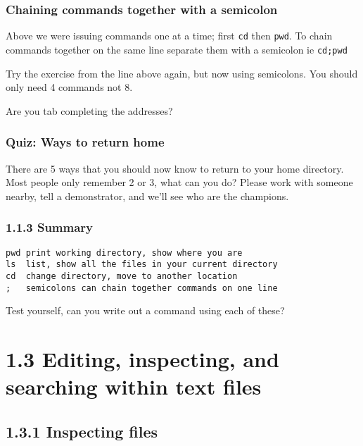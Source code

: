 \documentclass[11pt]{article}
\begin{document}
    \hypertarget{chaining-commands-together-with-a-semicolon}{%
\subsubsection{Chaining commands together with a
semicolon}\label{chaining-commands-together-with-a-semicolon}}

Above we were issuing commands one at a time; first \texttt{cd} then
\texttt{pwd}. To chain commands together on the same line separate them
with a semicolon ie \texttt{cd;pwd}

Try the exercise from the line above again, but now using semicolons.
You should only need 4 commands not 8.

Are you tab completing the addresses?

    \hypertarget{quiz-ways-to-return-home}{%
\subsubsection{Quiz: Ways to return
home}\label{quiz-ways-to-return-home}}

There are 5 ways that you should now know to return to your home
directory. Most people only remember 2 or 3, what can you do? Please
work with someone nearby, tell a demonstrator, and we'll see who are the
champions.

    \hypertarget{summary}{%
\subsubsection{1.1.3 Summary}\label{summary}}

\begin{verbatim}
pwd print working directory, show where you are
ls  list, show all the files in your current directory
cd  change directory, move to another location
;   semicolons can chain together commands on one line
\end{verbatim}

Test yourself, can you write out a command using each of these?

    \hypertarget{editing-inspecting-and-searching-within-text-files}{%
\section{1.3 Editing, inspecting, and searching within text
files}\label{editing-inspecting-and-searching-within-text-files}}

    \hypertarget{inspecting-files}{%
\subsection{1.3.1 Inspecting files}\label{inspecting-files}}
\end{document}
